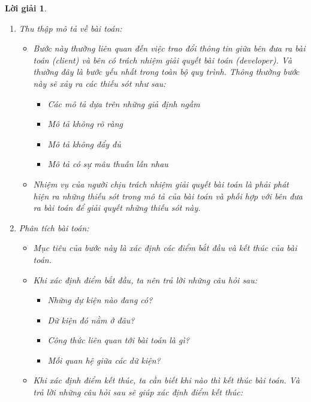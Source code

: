 \documentclass[14pt, a4paper]{article}
\theoremstyle{sltheorem}
\theoremstyle{soltheorem}
\newtheorem*{loigiai}{Lời giải}
\begin{document}
\begin{loigiai}
\begin{enumerate}[a)]
            \begin{enumerate}[1.]
                \item Thu thập mô tả về bài toán:
                \begin{itemize}
                    \item Bước này thường liên quan đến việc trao đổi thông tin giữa bên đưa ra bài toán (client) và bên có trách nhiệm giải quyết bài toán (developer). Và thường đây là bước yếu nhất trong toàn bộ quy trình. Thông thường bước này sẽ xảy ra các thiếu sót như sau:
                    \begin{itemize}
                        \item Các mô tả dựa trên những giả định ngầm
                        \item Mô tả không rõ ràng
                        \item Mô tả không đẩy đủ
                        \item Mô tả có sự mâu thuẫn lẫn nhau
                    \end{itemize}
                    \item Nhiệm vụ của người chịu trách nhiệm giải quyết bài toán là phải phát hiện ra những thiếu sót trong mô tả của bài toán và phối hợp với bên đưa ra bài toán để giải quyết những thiếu sót này.
                \end{itemize}
                \item Phân tích bài toán:
                \begin{itemize}
                    \item Mục tiêu của bước này là xác định các điểm bắt đầu và kết thúc của bài toán.
                    \item Khi xác định điểm bắt đầu, ta nên trả lời những câu hỏi sau:
                    \begin{itemize}
                        \item Những dự kiện nào đang có?
                        \item Dữ kiện đó nằm ở đâu?
                        \item Công thức liên quan tới bài toán là gì?
                        \item Mối quan hệ giữa các dữ kiện?
                    \end{itemize}
                    \item Khi xác định điểm kết thúc, ta cần biết khi nào thì kết thúc bài toán. Và trả lời những câu hỏi sau sẽ giúp xác định điểm kết thúc:
                    \begin{itemize}

\end{itemize}
\end{itemize}
\end{enumerate}
\end{enumerate}
\end{loigiai}
\end{document}
